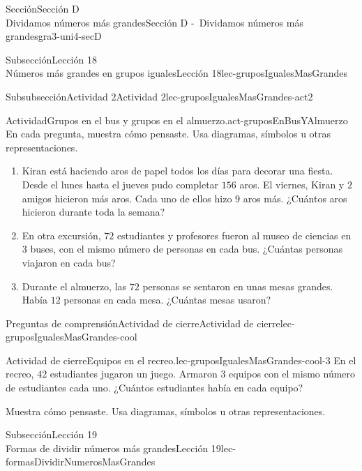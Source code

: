 \begin{sectionptx}{Sección}{{\Large Sección D\\}Dividamos números más grandes}{}{Sección D -~Dividamos números más grandes}{}{}{gra3-uni4-secD}
\begin{subsectionptx}{Subsección}{{\normalsize Lección 18\\[-0.05cm]}Números más grandes en grupos iguales}{}{Lección 18}{}{}{lec-gruposIgualesMasGrandes}
\typeout{************************************************}
%
\begin{subsubsectionptx}{Subsubsección}{Actividad 2}{}{Actividad 2}{}{}{lec-gruposIgualesMasGrandes-act2}
\begin{activity}{Actividad}{Grupos en el bus y grupos en el almuerzo.}{act-gruposEnBusYAlmuerzo}%
En cada pregunta, muestra cómo pensaste. Usa diagramas, símbolos u otras representaciones.%
%
\begin{enumerate}
\item{}Kiran está haciendo aros de papel todos los días para decorar una fiesta. Desde el lunes hasta el jueves pudo completar \(156\) aros. El viernes, Kiran y \(2\) amigos hicieron más aros. Cada uno de ellos hizo \(9\) aros más. ¿Cuántos aros hicieron durante toda la semana?%
\item{}En otra excursión, \(72\) estudiantes y profesores fueron al museo de ciencias en \(3\) buses, con el mismo número de personas en cada bus. ¿Cuántas personas viajaron en cada bus?%
\item{}Durante el almuerzo, las \(72\) personas se sentaron en unas mesas grandes. Había \(12\) personas en cada mesa. ¿Cuántas mesas usaron?%
\end{enumerate}
\end{activity}%
\end{subsubsectionptx}
%
%
\typeout{************************************************}
\typeout{************************************************}
%
\begin{reading-questions-subsubsection}{Preguntas de comprensión}{Actividad de cierre}{}{Actividad de cierre}{}{}{lec-gruposIgualesMasGrandes-cool}
\begin{project}{Actividad de cierre}{Equipos en el recreo.}{lec-gruposIgualesMasGrandes-cool-3}%
En el recreo, \(42\) estudiantes jugaron un juego. Armaron \(3\) equipos con el mismo número de estudiantes cada uno. ¿Cuántos estudiantes había en cada equipo?%
\par
Muestra cómo pensaste. Usa diagramas, símbolos u otras representaciones.%
\end{project}%
\end{reading-questions-subsubsection}
\end{subsectionptx}
%
%
\typeout{************************************************}
\typeout{************************************************}
%
\begin{subsectionptx}{Subsección}{{\normalsize Lección 19\\[-0.05cm]}Formas de dividir números más grandes}{}{Lección 19}{}{}{lec-formasDividirNumerosMasGrandes}

\end{subsectionptx}
\end{sectionptx}
